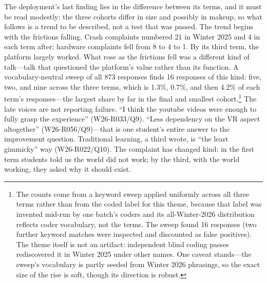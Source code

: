The deployment's last finding lies in the difference between its
terms, and it must be read modestly: the three cohorts differ in size
and possibly in makeup, so what follows is a trend to be described,
not a test that was passed. The trend begins with the frictions
falling. Crash complaints numbered 21 in Winter 2025 and 4 in each
term after; hardware complaints fell from 8 to 4 to 1. By its third
term, the platform largely worked. What rose as the frictions fell was
a different kind of talk---talk that questioned the platform's value
rather than its function. A vocabulary-neutral sweep of all 873
responses finds 16 responses of this kind: five, two, and nine across
the three terms, which is 1.3\%, 0.7\%, and then 4.2\% of each term's
responses---the largest share by far in the final and smallest
cohort.\footnote{The counts come from a
keyword sweep applied uniformly across all three terms rather than from
the coded label for this theme, because that label was invented mid-run
by one batch's coders and its all-Winter-2026 distribution reflects
coder vocabulary, not the terms. The sweep found 16 responses (two
further keyword matches were inspected and discounted as false
positives). The theme itself is not an artifact: independent blind
coding passes rediscovered it in Winter 2025 under other names. One
caveat stands---the sweep's vocabulary is partly seeded from Winter
2026 phrasings, so the exact size of the rise is soft, though its
direction is robust.} The late voices are not reporting failure. ``I
think the youtube videos were enough to fully grasp the experience''
(W26-R033/Q9). ``Less dependency on the VR aspect altogether''
(W26-R056/Q9)---that is one student's entire answer to the improvement
question. Traditional learning, a third wrote, is ``the least
gimmicky'' way (W26-R022/Q10). The complaint has changed kind:
in the first term students told us the world did not work; by the
third, with the world working, they asked why it should exist.

